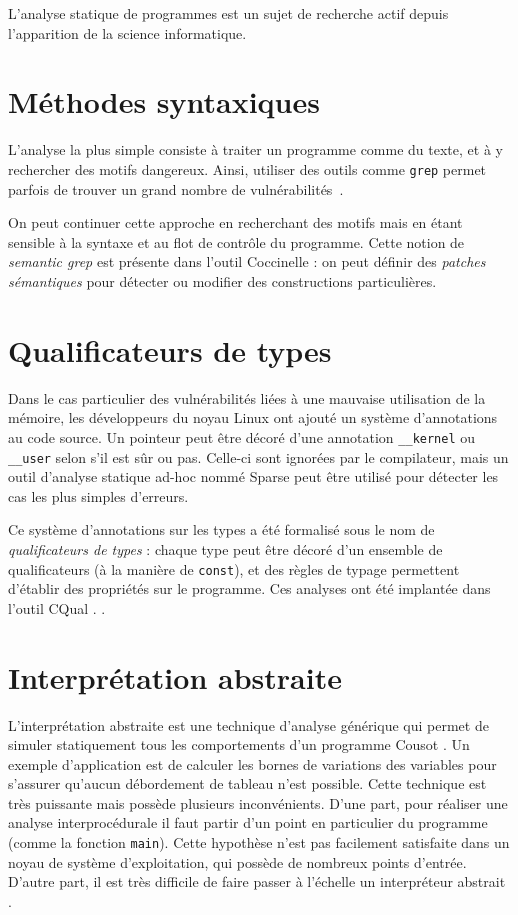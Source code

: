L'analyse statique de programmes est un sujet de recherche actif depuis
l'apparition de la science informatique.

\section{Méthodes syntaxiques}

L'analyse la plus simple consiste à traiter un programme comme du texte, et à y
rechercher des motifs dangereux. Ainsi, utiliser des outils comme \texttt{grep}
permet parfois de trouver un grand nombre de vulnérabilités~\cite{SpenderGrep}.

On peut continuer cette approche en recherchant des motifs mais en étant
sensible à la syntaxe et au flot de contrôle du programme. Cette notion de
\emph{semantic grep} est présente dans l'outil Coccinelle
\cite{coccinelle09,coccinelle11}  : on peut définir des
\emph{patches sémantiques} pour détecter ou modifier des constructions
particulières.

\section{Qualificateurs de types}

Dans le cas particulier des vulnérabilités liées à une mauvaise utilisation de
la mémoire, les développeurs du noyau Linux ont ajouté un système d'annotations
au code source. Un pointeur peut être décoré d'une annotation
\texttt{\_\_kernel} ou \texttt{\_\_user} selon s'il est sûr ou pas. Celle-ci
sont ignorées par le compilateur, mais un outil d'analyse statique ad-hoc nommé
Sparse  peut être utilisé pour détecter les cas les plus simples
d'erreurs.

Ce système d'annotations sur les types a été formalisé sous le nom de
\emph{qualificateurs de types} : chaque type peut être décoré d'un ensemble de
qualificateurs (à la manière de \texttt{const}), et des règles de typage
permettent d'établir des propriétés sur le programme. Ces analyses ont été
implantée dans l'outil CQual
\cite{pldi99,usenix01,pldi02,cquk-usenix04,toplas-quals}. .

\section{Interprétation abstraite}

L'interprétation abstraite est une technique d'analyse générique qui permet de
simuler statiquement tous les comportements d'un programme Cousot
\cite{Cousot77,Cousot92-1}. Un exemple d'application est de calculer les bornes
de variations des variables pour s'assurer qu'aucun débordement de tableau n'est
possible. Cette technique est très puissante mais possède plusieurs
inconvénients. D'une part, pour réaliser une analyse interprocédurale il faut
partir d'un point en particulier du programme (comme la fonction \texttt{main}).
Cette hypothèse n'est pas facilement satisfaite dans un noyau de système
d'exploitation, qui possède de nombreux points d'entrée. D'autre part,
il est très difficile de faire passer à l'échelle un interpréteur abstrait
\cite{AstreeScale,coverityBillion}.

